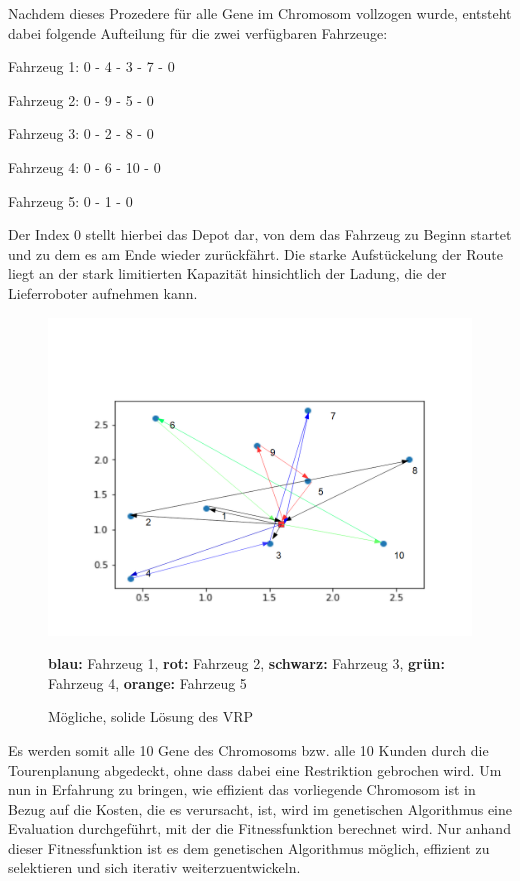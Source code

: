 \documentclass[a4paper,12pt,parskip,bibtotoc,liststotoc]{article}
\begin{document}
Nachdem dieses Prozedere für alle Gene im Chromosom vollzogen wurde, entsteht dabei folgende Aufteilung für die zwei verfügbaren Fahrzeuge: 

\begin{center}

Fahrzeug 1: 0 - 4 - 3 - 7 - 0

Fahrzeug 2: 0 - 9 - 5 - 0

Fahrzeug 3: 0 - 2 - 8 - 0

Fahrzeug 4: 0 - 6 - 10 - 0

Fahrzeug 5: 0 - 1 - 0

\end{center}


Der Index 0 stellt hierbei das Depot dar, von dem das Fahrzeug zu Beginn startet und zu dem es am Ende wieder zurückfährt.
Die starke Aufstückelung der Route liegt an der stark limitierten Kapazität hinsichtlich der Ladung, die der Lieferroboter aufnehmen kann.




\begin{figure}[h!]
  \begin{center}
    \includegraphics[width=150mm]{vrppp2.png}
    \caption{Mögliche, solide Lösung des VRP}  \label{Typen}
    {\footnotesize \textbf{blau:} Fahrzeug 1, \textbf{rot:} Fahrzeug 2, \textbf{schwarz:} Fahrzeug 3, \textbf{grün:} Fahrzeug 4, \textbf{orange:} Fahrzeug 5}
  \end{center}
\end{figure}

Es werden somit alle 10 Gene des Chromosoms bzw. alle 10 Kunden durch die Tourenplanung abgedeckt, ohne dass dabei eine Restriktion gebrochen wird.
Um nun in Erfahrung zu bringen, wie effizient das vorliegende Chromosom ist in Bezug auf die Kosten, die es verursacht, ist, wird im genetischen Algorithmus eine Evaluation durchgeführt, mit der die Fitnessfunktion berechnet wird. 
Nur anhand dieser Fitnessfunktion ist es dem genetischen Algorithmus möglich, effizient zu selektieren und sich iterativ weiterzuentwickeln.
\end{document}
